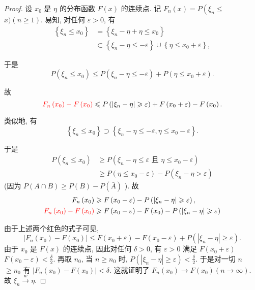 \begin{proof}
    设 $x_0$ 是 $\eta$ 的分布函数 $F(x)$ 的连续点. 记 $F_n(x)=P\left(\xi_n \leqslant\right.$ $x)(n \geqslant 1)$. 易知, 对任何 $\varepsilon>0$, 有
$$
\begin{aligned}
\left\{\xi_n \leqslant x_0\right\} & =\left\{\xi_n-\eta+\eta \leqslant x_0\right\} \\
& \subset\left\{\xi_n-\eta \leqslant-\varepsilon\right\} \cup\left\{\eta \leqslant x_0+\varepsilon\right\},
\end{aligned}
$$

于是
$$
P\left(\xi_n \leqslant x_0\right) \leqslant P\left(\xi_n-\eta \leqslant-\varepsilon\right)+P\left(\eta \leqslant x_0+\varepsilon\right) .
$$

故$${{\color{red}F_n\left(x_0\right)-F\left(x_0\right)}} \leqslant P\left(\left|\xi_n-\eta\right| \geqslant \varepsilon\right)+F\left(x_0+\varepsilon\right)-F\left(x_0\right) .$$

类似地, 有
$$
\left\{\xi_n \leqslant x_0\right\} \supset\left\{\xi_n-\eta \leqslant-\varepsilon, \eta \leqslant x_0-\varepsilon\right\} .
$$

于是$$
\begin{aligned}
P\left(\xi_n \leqslant x_0\right) & \geqslant P\left(\xi_n-\eta \leqslant \varepsilon \text { 且 } \eta \leqslant x_0-\varepsilon\right) \\
& \geqslant P\left(\eta \leqslant x_0-\varepsilon\right)-P\left(\xi_n-\eta>\varepsilon\right)
\end{aligned}
$$
(因为 $P(A \cap B) \geqslant P(B)-P(\bar{A})$ ).
故
$$
\begin{aligned}
F_n\left(x_0\right) & \geqslant F\left(x_0-\varepsilon\right)-P\left(\left|\xi_n-\eta\right| \geqslant \varepsilon\right), \\
\color{red}F_n\left(x_0\right)-F\left(x_0\right) & \geqslant F\left(x_0-\varepsilon\right)-F\left(x_0\right)-P\left(\left|\xi_n-\eta\right| \geqslant \varepsilon\right)
\end{aligned}
$$

由于上述两个红色的式子可见, $$
\left|F_n\left(x_0\right)-F\left(x_0\right)\right| \leqslant F\left(x_0+\varepsilon\right)-F\left(x_0-\varepsilon\right)+P\left(\left|\xi_n-\eta\right| \geqslant \varepsilon\right) .
$$
由于 $x_0$ 是 $F(x)$ 的连续点, 因此对任何 $\delta>0$, 有 $\varepsilon>0$ 满足 $F\left(x_0+\varepsilon\right)$ $F\left(x_0-\varepsilon\right)<\frac{\delta}{2}$. 再取 $n_0$, 当 $n \geqslant n_0$ 时, $P\left(\left|\xi_n-\eta\right| \geqslant \varepsilon\right)<\frac{\delta}{2}$. 于是对一切 $n$ $\geqslant n_0$ 有 $\left|F_n\left(x_0\right)-F\left(x_0\right)\right|<\delta$. 这就证明了 $F_n\left(x_0\right) \rightarrow F\left(x_0\right)(n \rightarrow \infty)$. 故 $\xi_n \stackrel{w}{\longrightarrow} \eta$.
\end{proof}

